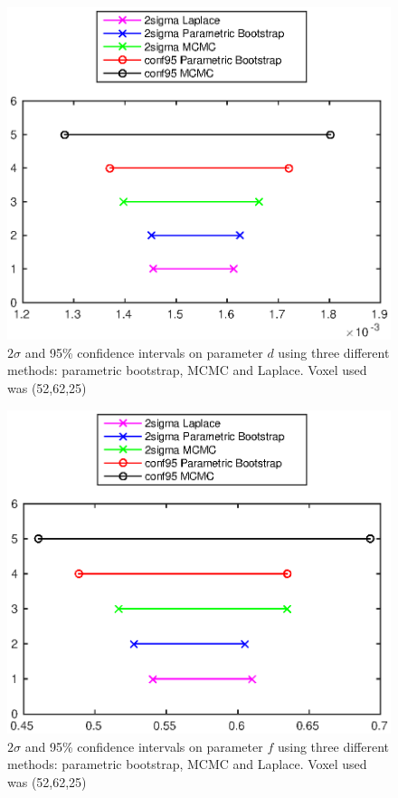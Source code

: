 \documentclass[11pt,a4paper,oneside]{report}
\begin{document}
\begin{figure}[H]
      \centering
    \includegraphics[scale=1]{figures/q2/q123-p2.eps}
    \caption{$2\sigma$ and 95\% confidence intervals on parameter $d$ using three different methods: parametric bootstrap, MCMC and Laplace. Voxel used was (52,62,25) }
    \label{q123-p2}
\end{figure}

\begin{figure}[H]
      \centering
    \includegraphics[scale=1]{figures/q2/q123-p3.eps}
    \caption{$2\sigma$ and 95\% confidence intervals on parameter $f$ using three different methods: parametric bootstrap, MCMC and Laplace. Voxel used was (52,62,25) }
    \label{q123-p3}
\end{figure}
\end{document}
